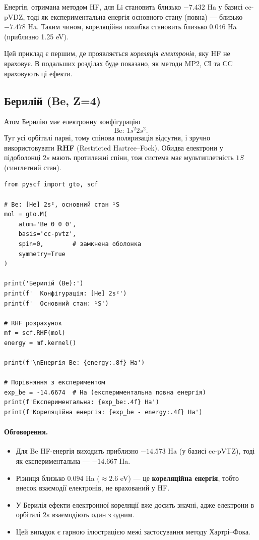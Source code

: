 Енергія, отримана методом HF, для Li становить близько \(-7.432\) Ha у базисі cc-pVDZ, тоді як експериментальна енергія основного стану (повна) --- близько \(-7.478\) Ha.
Таким чином, кореляційна похибка становить близько \(0.046\) Ha (приблизно 1.25 eV).

Цей приклад є першим, де проявляється \emph{кореляція електронів}, яку HF не враховує. В подальших розділах буде показано, як методи MP2, CI та CC враховують ці ефекти.

\subsection{Берилій (Be, Z=4)}

Атом Берилію має електронну конфігурацію
\[
    \text{Be: } 1s^2 2s^2.
\]
Тут усі орбіталі парні, тому спінова поляризація відсутня, і зручно використовувати \textbf{RHF} (Restricted Hartree–Fock).
Обидва електрони у підоболонці \(2s\) мають протилежні спіни, тож система має мультиплетність \(1S\) (синглетний стан).

\begin{verbatim}
from pyscf import gto, scf

# Be: [He] 2s², основний стан ¹S
mol = gto.M(
    atom='Be 0 0 0',
    basis='cc-pvtz',
    spin=0,        # замкнена оболонка
    symmetry=True
)

print('Берилій (Be):')
print(f'  Конфігурація: [He] 2s²')
print(f'  Основний стан: ¹S')

# RHF розрахунок
mf = scf.RHF(mol)
energy = mf.kernel()

print(f'\nЕнергія Be: {energy:.8f} Ha')

# Порівняння з експериментом
exp_be = -14.6674  # Ha (експериментальна повна енергія)
print(f'Експериментальна: {exp_be:.4f} Ha')
print(f'Кореляційна енергія: {exp_be - energy:.4f} Ha')
\end{verbatim}

\paragraph{Обговорення.}
\begin{itemize}
    \item Для Be HF-енергія виходить приблизно \(-14.573\) Ha (у базисі cc-pVTZ), тоді як експериментальна --- \(-14.667\) Ha.
    \item Різниця близько \(0.094\) Ha (\(\approx 2.6\) eV) --- це \textbf{кореляційна енергія}, тобто внесок взаємодії електронів, не врахований у HF.
    \item У Берилія ефекти електронної кореляції вже досить значні, адже електрони в орбіталі \(2s\) взаємодіють один з одним.
    \item Цей випадок є гарною ілюстрацією межі застосування методу Хартрі–Фока.
\end{itemize}

